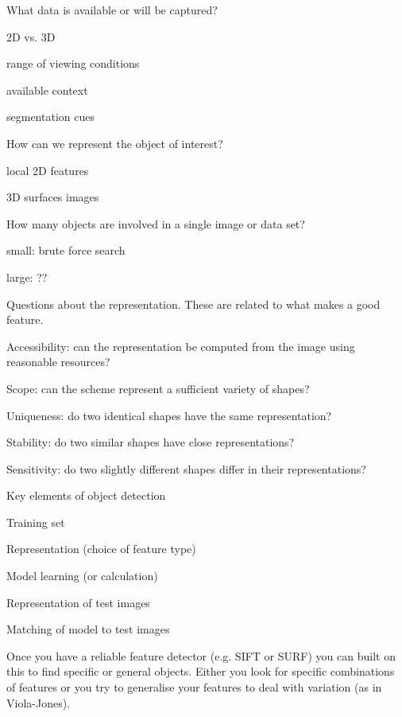 \documentclass[8pt]{extarticle}
\begin{document}
\begin{multicols}{2}
What data is available or will be captured?
\begin{compactitem}
\item 2D vs. 3D
\item range of viewing conditions
\item available context
\item segmentation cues
\end{compactitem}

How can we represent the object of interest?
\begin{compactitem}
\item local 2D features
\item 3D surfaces images
\end{compactitem}

How many objects are involved in a single image or data set?
\begin{compactitem}
\item small: brute force search
\item large: ??
\end{compactitem}

Questions about the representation. These are related to what makes a good feature.
\begin{compactitem}
    \item Accessibility: can the representation be computed from the image using reasonable resources?
    \item Scope: can the scheme represent a sufficient variety of shapes?
    \item Uniqueness: do two identical shapes have the same representation?
    \item Stability: do two similar shapes have close representations?
    \item Sensitivity: do two slightly different shapes differ in their representations?
\end{compactitem}

Key elements of object detection
\begin{compactitem}
    \item Training set
    \item Representation (choice of feature type)
    \item Model learning (or calculation)
    \item Representation of test images
    \item Matching of model to test images
\end{compactitem}

Once you have a reliable feature detector (e.g. SIFT or SURF) you can built on this to find specific or general objects. Either you look for specific combinations of features or you try to generalise your features to deal with variation (as in Viola-Jones).


\end{multicols}
\end{document}
